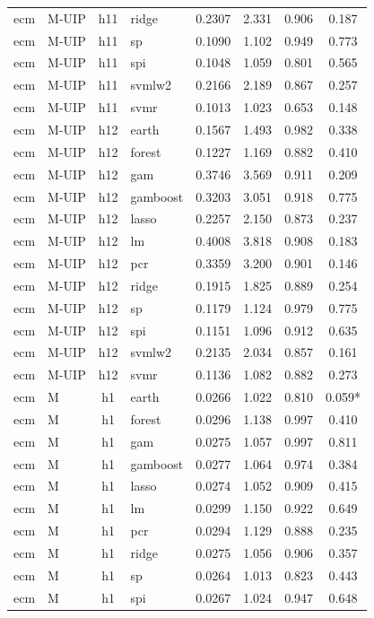 \begin{ThreePartTable}
\begin{longtable}[t]{llclcccc}
ecm & M-UIP & h11 & ridge & 0.2307 & 2.331 & 0.906 & 0.187\\
ecm & M-UIP & h11 & sp & 0.1090 & 1.102 & 0.949 & 0.773\\
ecm & M-UIP & h11 & spi & 0.1048 & 1.059 & 0.801 & 0.565\\
ecm & M-UIP & h11 & svmlw2 & 0.2166 & 2.189 & 0.867 & 0.257\\
ecm & M-UIP & h11 & svmr & 0.1013 & 1.023 & 0.653 & 0.148\\
\addlinespace
ecm & M-UIP & h12 & earth & 0.1567 & 1.493 & 0.982 & 0.338\\
ecm & M-UIP & h12 & forest & 0.1227 & 1.169 & 0.882 & 0.410\\
ecm & M-UIP & h12 & gam & 0.3746 & 3.569 & 0.911 & 0.209\\
ecm & M-UIP & h12 & gamboost & 0.3203 & 3.051 & 0.918 & 0.775\\
ecm & M-UIP & h12 & lasso & 0.2257 & 2.150 & 0.873 & 0.237\\
ecm & M-UIP & h12 & lm & 0.4008 & 3.818 & 0.908 & 0.183\\
ecm & M-UIP & h12 & pcr & 0.3359 & 3.200 & 0.901 & 0.146\\
ecm & M-UIP & h12 & ridge & 0.1915 & 1.825 & 0.889 & 0.254\\
ecm & M-UIP & h12 & sp & 0.1179 & 1.124 & 0.979 & 0.775\\
ecm & M-UIP & h12 & spi & 0.1151 & 1.096 & 0.912 & 0.635\\
ecm & M-UIP & h12 & svmlw2 & 0.2135 & 2.034 & 0.857 & 0.161\\
ecm & M-UIP & h12 & svmr & 0.1136 & 1.082 & 0.882 & 0.273\\
\addlinespace
ecm & M & h1 & earth & 0.0266 & 1.022 & 0.810 & 0.059*\\
ecm & M & h1 & forest & 0.0296 & 1.138 & 0.997 & 0.410\\
ecm & M & h1 & gam & 0.0275 & 1.057 & 0.997 & 0.811\\
ecm & M & h1 & gamboost & 0.0277 & 1.064 & 0.974 & 0.384\\
ecm & M & h1 & lasso & 0.0274 & 1.052 & 0.909 & 0.415\\
ecm & M & h1 & lm & 0.0299 & 1.150 & 0.922 & 0.649\\
ecm & M & h1 & pcr & 0.0294 & 1.129 & 0.888 & 0.235\\
ecm & M & h1 & ridge & 0.0275 & 1.056 & 0.906 & 0.357\\
ecm & M & h1 & sp & 0.0264 & 1.013 & 0.823 & 0.443\\
ecm & M & h1 & spi & 0.0267 & 1.024 & 0.947 & 0.648\\

\end{longtable}
\end{ThreePartTable}
